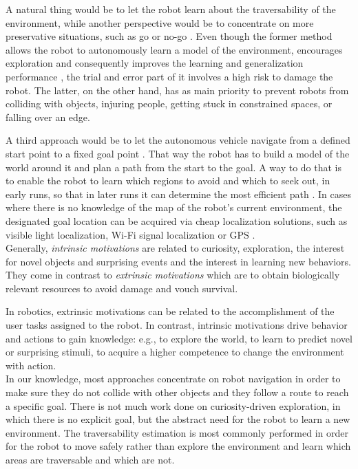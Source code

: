 \documentclass[12pt,a4paper,table,dvipsnames,tikz]{report}
\newcommand{\term}{\textit}
\newcommand{\acronym}{\MakeUppercase}
\begin{document}
	A natural thing would be to let the robot learn about the traversability 
	of the environment, while another perspective would be to concentrate on more 
	preservative situations, such as go or no-go \citep{Hirose}. Even though the 
	former method allows the robot to autonomously learn a model of the environment,
	encourages exploration and consequently improves the learning and generalization 
	performance \citep{Zhelo}, the trial and error part of it involves a high risk to 
	damage the robot. The latter, on the other hand, has as main priority to prevent 
	robots from colliding with objects, injuring people, getting stuck in constrained 
	spaces, or falling over an edge. 
	\par
	A third approach would be to let the autonomous vehicle navigate from a defined 
	start point to a fixed goal	point \citep{Shneier, Zhelo}. That way the robot has 
	to build a model of the world around it and plan a path from the start to the 
	goal. A way to do that is to enable the robot to learn which regions to avoid 
	and which to seek out, in early runs, so that in later runs it can determine the 
	most efficient path \citep{Shneier}. In cases where there is no knowledge of 
	the map of the robot's current environment, the designated goal location can be 
	acquired via cheap localization solutions, such as visible light localization, 
	Wi-Fi signal localization or \acronym{gps} \citep{Zhelo}.
	\\
	
	Generally, \term{intrinsic motivations} are related to curiosity, exploration, 
	the interest for novel objects and surprising events and the interest in 
	learning new behaviors. They come in contrast to \term{extrinsic motivations} 
	which are to obtain biologically relevant resources to avoid damage and vouch 
	survival.
	\par
	In robotics, extrinsic motivations can be related to the accomplishment of the 
	user tasks assigned to the robot. In contrast, intrinsic motivations drive 
	behavior and actions to gain knowledge: e.g., to explore the world, to learn to 
	predict novel or surprising stimuli, to acquire a higher competence to change 
	the environment with action.
	\\
	
	In our knowledge, most approaches concentrate on robot navigation in order to 
	make sure they do not collide with other objects and they follow a route to 
	reach a specific goal. There is not much work done on curiosity-driven 
	exploration, in which there is no explicit goal, but the abstract need for the 
	robot to learn a new environment. The traversability estimation is most commonly 
	performed in order for the robot to move safely rather than explore the 
	environment and learn which areas are traversable and which are not.
	\\
		
\end{document}
